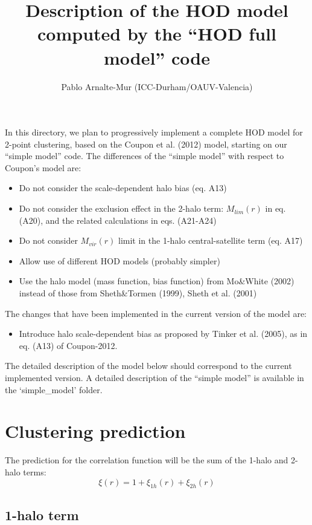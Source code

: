 \documentclass[10pt,a4paper]{article}
\title{Description of the HOD model computed by the ``HOD full model'' code}
\author{Pablo Arnalte-Mur (ICC-Durham/OAUV-Valencia)}
\begin{document}
\maketitle

In this directory, we plan to progressively implement a complete HOD model for 2-point clustering, based on the Coupon et al. (2012) model, starting on our ``simple model'' code. 
The differences of the ``simple model'' with respect to Coupon's model are:

\begin{itemize}

\item Do not consider the scale-dependent halo bias (eq. A13)
\item Do not consider the exclusion effect in the 2-halo term: $M_{lim}(r)$ in eq. (A20),
  and the related calculations in eqs. (A21-A24)
\item Do not consider $M_{vir}(r)$ limit in the 1-halo central-satellite term (eq. A17)
\item Allow use of different HOD models (probably simpler)
\item Use the halo model (mass function, bias function) from Mo\&White (2002) instead of those from Sheth\&Tormen (1999), Sheth et al. (2001)
\end{itemize}


The changes that have been implemented in the current version of the model are:
\begin{itemize}
\item Introduce halo scale-dependent bias as proposed by Tinker et al. (2005), as in eq. (A13) of Coupon-2012.
\end{itemize}


The detailed description of the model below should correspond to the current implemented version. 
A detailed description of the ``simple model'' is available in the `simple\_model' folder.

\section{Clustering prediction}

The prediction for the correlation function will be the sum of the 1-halo and 2-halo terms:
\begin{equation}
\xi(r) = 1 + \xi_{1h}(r) + \xi_{2h}(r)
\end{equation}

\subsection{1-halo term}
\end{document}
